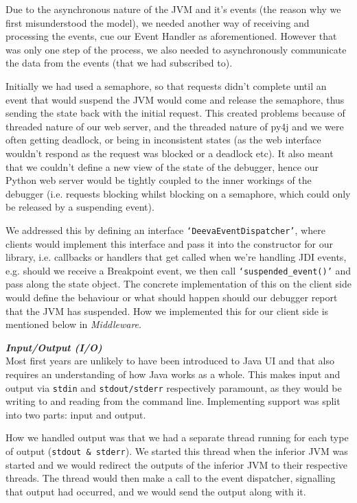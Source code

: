 \documentclass[11pt, a4paper]{article}
\begin{document}
Due to the asynchronous nature of the JVM and it's events (the reason why we first misunderstood the model), we needed another way of receiving and processing the events, cue our Event Handler as aforementioned.
However that was only one step of the process, we also needed to asynchronously communicate the data from the events (that we had subscribed to). 

Initially we had used a semaphore, so that requests didn't complete until an event that would suspend the JVM would come and release the semaphore, thus sending the state back with the initial request.
This created problems because of threaded nature of our web server, and the threaded nature of py4j and we were often getting deadlock, or being in inconsistent states (as the web interface wouldn't respond as the request was blocked or a deadlock etc).
It also meant that we couldn't define a new view of the state of the debugger, hence our Python web server would be tightly coupled to the inner workings of the debugger (i.e. requests blocking whilst blocking on a semaphore, which could only be released by a suspending event).

We addressed this by defining an interface \texttt{`DeevaEventDispatcher'}, where clients would implement this interface and pass it into the constructor for our library, i.e. callbacks or handlers that get called when we're handling JDI events, e.g. should we receive a Breakpoint event, we then call \texttt{`suspended\_event()'} and pass along the state object.
The concrete implementation of this on the client side would define the behaviour or what should happen should our debugger report that the JVM has suspended.
How we implemented this for our client side is mentioned below in \emph{Middleware}. 

\textbf{\emph{Input/Output (I/O)}}\\
Most first years are unlikely to have been introduced to Java UI and that also requires an understanding of how Java works as a whole.
This makes input and output via \texttt{stdin} and \texttt{stdout/stderr} respectively paramount, as they would be writing to and reading from the command line.
Implementing support was split into two parts: input and output.

How we handled output was that we had a separate thread running for each type of output (\texttt{stdout \& stderr}). We started this thread when the inferior JVM was started and we would redirect the outputs of the inferior JVM to their respective threads.
The thread would then make a call to the event dispatcher, signalling that output had occurred, and we would send the output along with it.
\end{document}
